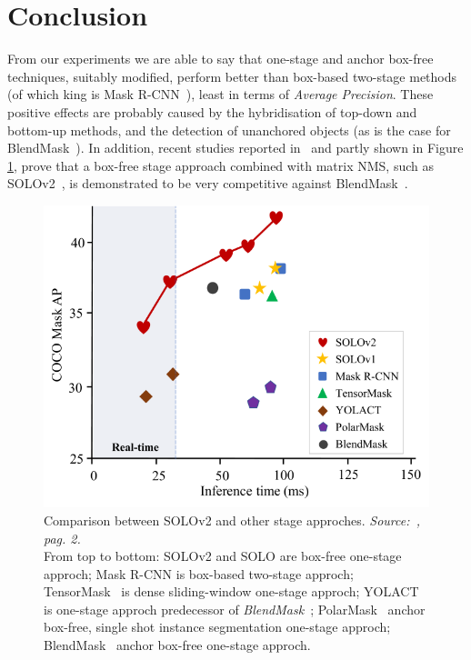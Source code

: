 \documentclass[10pt,twocolumn,letterpaper]{article}
\begin{document}
\section{Conclusion}
From our experiments we are able to say that one-stage and anchor box-free techniques, suitably modified, perform better than box-based two-stage methods (of which king is Mask R-CNN~\cite{Authors1_maskrcnn}), least in terms of \textit{Average Precision}. These positive effects are probably caused by the hybridisation of top-down and bottom-up methods, and the detection of unanchored objects (as is the case for BlendMask~\cite{Authors2_BlendMask}). In addition, recent studies reported in~\cite{Authors6_SOLOv2} and partly shown in Figure \ref{fig:conclusionSOLOv2}, prove that a box-free stage approach combined with matrix NMS, such as SOLOv2~\cite{Authors6_SOLOv2}, is demonstrated to be very competitive against BlendMask~\cite{Authors2_BlendMask}.
\begin{figure}[H]
\centering
  \includegraphics[width=0.7\linewidth]{./image/conclusion_SOLOv2.png}
  \caption{Comparison between SOLOv2 and other stage approches. \textit{Source:~\cite{Authors6_SOLOv2}, pag. 2.}\\ From top to bottom: SOLOv2\cite{Authors6_SOLOv2} and SOLO\cite{solo} are box-free one-stage approch; Mask R-CNN is box-based two-stage approch; TensorMask~\cite{tensormask} is dense sliding-window one-stage approch; YOLACT~\cite{yolact} is one-stage approch predecessor of \textit{BlendMask}~\cite{Authors2_BlendMask}; PolarMask~\cite{polarmask} anchor box-free, single shot instance segmentation one-stage approch; BlendMask~\cite{Authors2_BlendMask} anchor box-free one-stage approch.}
  \label{fig:conclusionSOLOv2}
\noindent
\end{figure}
\end{document}

